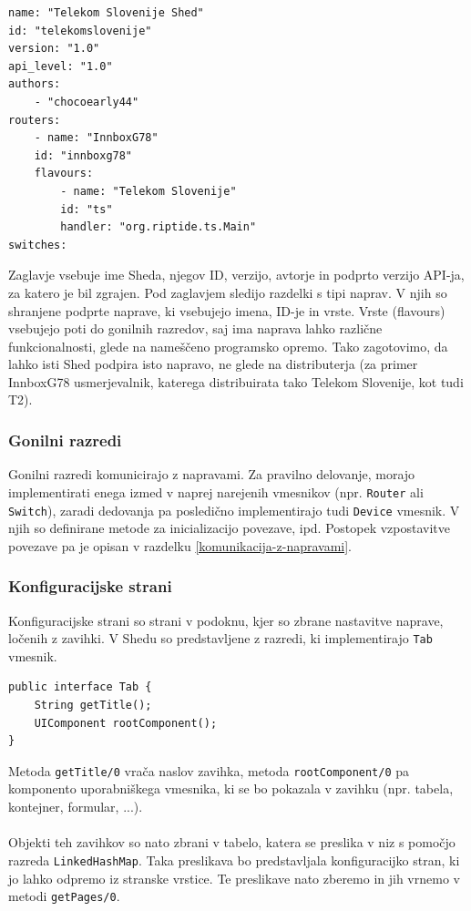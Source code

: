 \documentclass[12pt]{article}
\begin{document}
\begin{lstlisting}[style=XmlStyle]
name: "Telekom Slovenije Shed"
id: "telekomslovenije"
version: "1.0"
api_level: "1.0"
authors:
	- "chocoearly44"
routers:
	- name: "InnboxG78"
	id: "innboxg78"
	flavours:
		- name: "Telekom Slovenije"
		id: "ts"
		handler: "org.riptide.ts.Main"
switches:
\end{lstlisting}
Zaglavje vsebuje ime Sheda, njegov ID, verzijo, avtorje in podprto verzijo
API-ja, za katero je bil zgrajen. Pod zaglavjem sledijo razdelki s tipi
naprav. V njih so shranjene podprte naprave, ki vsebujejo imena, ID-je in
vrste. Vrste (flavours) vsebujejo poti do gonilnih razredov, saj ima naprava
lahko različne funkcionalnosti, glede na nameščeno programsko opremo. Tako
zagotovimo, da lahko isti Shed podpira isto napravo, ne glede na
distributerja (za primer InnboxG78 usmerjevalnik, katerega distribuirata
tako Telekom Slovenije, kot tudi T2).

\subsubsection{Gonilni razredi}
Gonilni razredi komunicirajo z napravami. Za pravilno delovanje, morajo
implementirati enega izmed v naprej narejenih vmesnikov (npr.
\texttt{Router} ali \texttt{Switch}), zaradi dedovanja pa posledično
implementirajo tudi \texttt{Device} vmesnik. V njih so definirane metode
za inicializacijo povezave, ipd. Postopek vzpostavitve povezave pa je
opisan v razdelku \ref{komunikacija-z-napravami}.

\subsubsection{Konfiguracijske strani} \label{konfiguracijske-strani}
Konfiguracijske strani so strani v podoknu, kjer so zbrane nastavitve
naprave, ločenih z zavihki. V Shedu so predstavljene z razredi, ki
implementirajo \texttt{Tab} vmesnik.

\begin{lstlisting}[style=JavaStyle]
public interface Tab {
	String getTitle();
	UIComponent rootComponent();
}
\end{lstlisting}
Metoda \texttt{getTitle/0} vrača naslov zavihka, metoda
\texttt{rootComponent/0} pa komponento uporabniškega vmesnika, ki se bo
pokazala v zavihku (npr. tabela, kontejner, formular, ...).
\\\\
Objekti teh zavihkov so nato zbrani v tabelo, katera se preslika v niz s
pomočjo razreda \texttt{LinkedHashMap}. Taka preslikava bo predstavljala
konfiguracijko stran, ki jo lahko odpremo iz stranske vrstice. Te
preslikave nato zberemo in jih vrnemo v metodi \texttt{getPages/0}.
\end{document}
